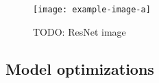 
\begin{figure}[hbtp]
\centering    
\texttt{[image: example-image-a]}
\caption{TODO: ResNet image}
\end{figure}

\subsection{Model optimizations}
